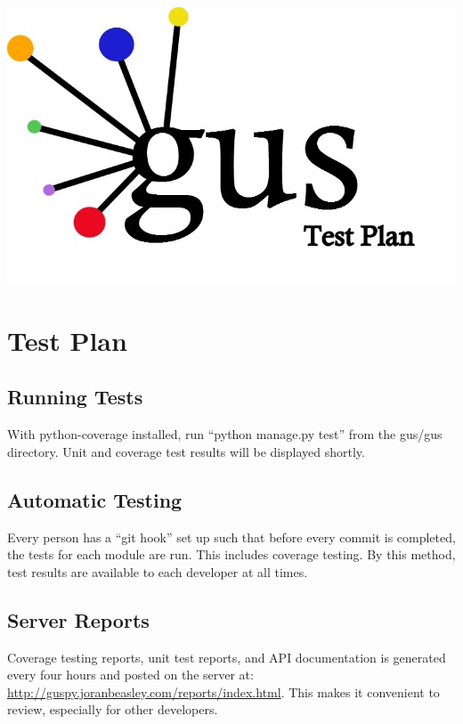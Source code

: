 \documentclass[12pt]{report}
\begin{document}
\setcounter{page}{1}
\renewcommand*\thesection{\arabic{section}}

\begin{center}
\includegraphics[scale=0.45]{gus_black_testplan[1].jpg}
\end{center}

\section{Test Plan}

\subsection{Running Tests}
With python-coverage installed, run ``python manage.py test'' from the gus/gus directory. Unit and coverage test results will be displayed shortly.

\subsection{Automatic Testing}
Every person has a ``git hook'' set up such that before every commit is completed, the tests for each module are run. This includes coverage testing. By this method, test results are available to each developer at all times.

\subsection{Server Reports}
Coverage testing reports, unit test reports, and API documentation is generated every four hours and posted on the server at: 
\url{http://guspy.joranbeasley.com/reports/index.html}. 
This makes it convenient to review, especially for other developers. \\[0.1pt]
\end{document}
